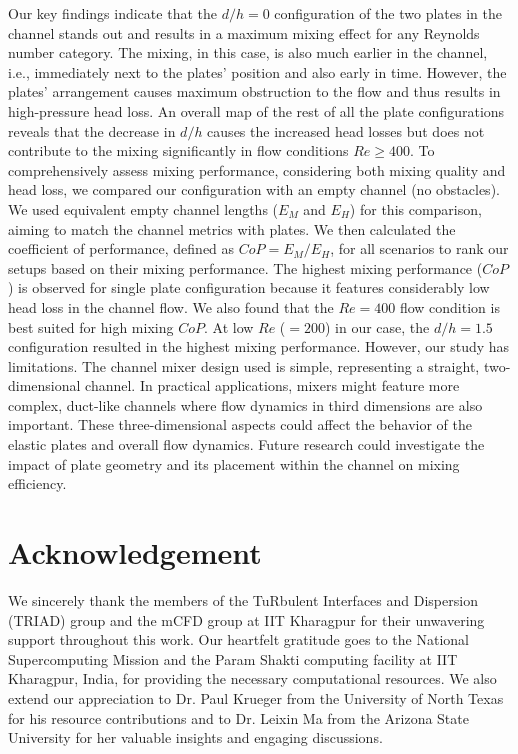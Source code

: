 \documentclass[reprint,a4paper,fleqn]{cas-dc} %
\begin{document}
		Our key findings indicate that the $d/h=0$ configuration of the two plates in the channel stands out and results in a maximum mixing effect for any Reynolds number category. The mixing, in this case, is also much earlier in the channel, i.e., immediately next to the plates' position and also early in time. However, the plates' arrangement causes maximum obstruction to the flow and thus results in high-pressure head loss. An overall map of the rest of all the plate configurations reveals that the decrease in $d/h$ causes the increased head losses but does not contribute to the mixing significantly in flow conditions $Re\geq400$. To comprehensively assess mixing performance, considering both mixing quality and head loss, we compared our configuration with an empty channel (no obstacles). We used equivalent empty channel lengths ($E_M$ and $E_H$) for this comparison, aiming to match the channel metrics with plates. We then calculated the coefficient of performance, defined as $CoP = E_M/E_H$, for all scenarios to rank our setups based on their mixing performance. The highest mixing performance ($CoP$) is observed for single plate configuration because it features considerably low head loss in the channel flow. We also found that the $Re=400$ flow condition is best suited for high mixing $CoP$. At low $Re$ ($=200$) in our case, the $d/h=1.5$ configuration resulted in the highest mixing performance.
		However, our study has limitations. The channel mixer design used is simple, representing a straight, two-dimensional channel. In practical applications, mixers might feature more complex, duct-like channels where flow dynamics in third dimensions are also important. These three-dimensional aspects could affect the behavior of the elastic plates and overall flow dynamics. Future research could investigate the impact of plate geometry and its placement within the channel on mixing efficiency.
		
		\section{Acknowledgement}
		
		We sincerely thank the members of the TuRbulent Interfaces and Dispersion (TRIAD) group and the mCFD group at IIT Kharagpur for their unwavering support throughout this work. Our heartfelt gratitude goes to the National Supercomputing Mission and the Param Shakti computing facility at IIT Kharagpur, India, for providing the necessary computational resources. We also extend our appreciation to Dr. Paul Krueger from the University of North Texas for his resource contributions and to Dr. Leixin Ma from the Arizona State University for her valuable insights and engaging discussions.
		
\end{document}
